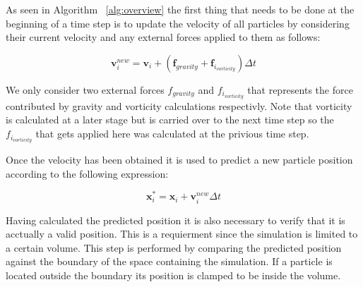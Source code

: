 As seen in Algorithm ~\ref{alg:overview} the first thing that needs to be done at the
beginning of a time step is to update the velocity of all particles by
considering their current velocity and any external forces applied to them as follows:

\begin{equation}
\label{eq:velocity}
\mathbf{v}_{i}^{new} = \mathbf{v}_{i} + (\mathbf{f}_{gravity} + \mathbf{f}_{i_{vorticity}})\Delta t
\end{equation}

We only consider two external forces $ f_{gravity} $ and $ f_{i_{vorticity}} $
that represents the force contributed by gravity and vorticity calculations
respectivly. Note that vorticity is calculated at a later stage but is carried
over to the next time step so the $ f_{i_{vorticity}} $ that gets applied here
was calculated at the privious time step.

Once the velocity has been obtained it is used to predict a new particle
position according to the following expression:

\begin{equation}
\label{eq:predict}
\mathbf{x}_{i}^{*}= \mathbf{x}_{i} + \mathbf{v}_{i}^{new} \Delta t
\end{equation}

Having calculated the predicted position it is also necessary to verify that it
is acctually a valid position. This is a requierment since the simulation is
limited to a certain volume. This step is performed by comparing the predicted
position against the boundary of the space containing the simulation. If a
particle is located outside the boundary its position is clamped to be inside
the volume.
